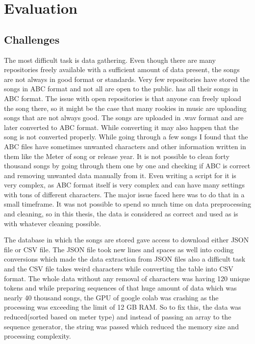 \documentclass[oneside,12pt]{Classes/RoboticsLaTeX}
\begin{document}
\chapter{Evaluation}
\label{chap:eval}

\section{Challenges}

The most difficult task is data gathering. Even though there are many repositories freely available with a sufficient amount of data present, the songs are not always in good format or standards. Very few repositories have stored the songs in ABC format and not all are open to the public. \cite{session} has all their songs in ABC format. The issue with open repositories is that anyone can freely upload the song there, so it might be the case that many rookies in music are uploading songs that are not always good. The songs are uploaded in .wav format and are later converted to ABC format. While converting it may also happen that the song is not converted properly. While going through a few songs I found that the ABC files have sometimes unwanted characters and other information written in them like the Meter of song or release year. It is not possible to clean forty thousand songs by going through them one by one and checking if ABC is correct and removing unwanted data manually from it. Even writing a script for it is very complex, as ABC format itself is very complex and can have many settings with tons of different characters. The major issue faced here was to do that in a small timeframe. It was not possible to spend so much time on data preprocessing and cleaning, so in this thesis, the data is considered as correct and used as is with whatever cleaning possible.

The database in which the songs are stored gave access to download either JSON file or CSV file. The JSON file took new lines and spaces as well into coding conversions which made the data extraction from JSON files also a difficult task and the CSV file takes weird characters while converting the table into CSV format. The whole data without any removal of characters was having 120 unique tokens and while preparing sequences of that huge amount of data which was nearly 40 thousand songs, the GPU of google colab was crashing as the processing was exceeding the limit of 12 GB RAM. So to fix this, the data was reduced(sorted based on meter type) and instead of passing an array to the sequence generator, the string was passed which reduced the memory size and processing complexity.
\end{document}
